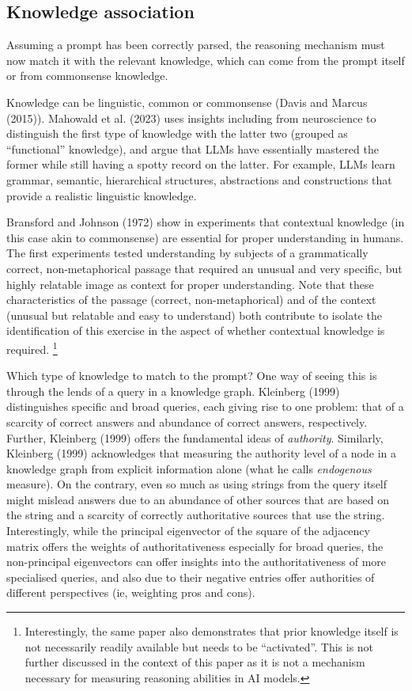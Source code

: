 \documentclass[
]{article}
\begin{document}
\subsection{Knowledge association}\label{knowledge-association}

Assuming a prompt has been correctly parsed, the reasoning mechanism
must now match it with the relevant knowledge, which can come from the
prompt itself or from commonsense knowledge.

Knowledge can be linguistic, common or commonsense (Davis and Marcus
(2015)). Mahowald et al. (2023) uses insights including from
neuroscience to distinguish the first type of knowledge with the latter
two (grouped as ``functional'' knowledge), and argue that LLMs have
essentially mastered the former while still having a spotty record on
the latter. For example, LLMs learn grammar, semantic, hierarchical
structures, abstractions and constructions that provide a realistic
linguistic knowledge.

Bransford and Johnson (1972) show in experiments that contextual
knowledge (in this case akin to commonsense) are essential for proper
understanding in humans. The first experiments tested understanding by
subjects of a grammatically correct, non-metaphorical passage that
required an unusual and very specific, but highly relatable image as
context for proper understanding. Note that these characteristics of the
passage (correct, non-metaphorical) and of the context (unusual but
relatable and easy to understand) both contribute to isolate the
identification of this exercise in the aspect of whether contextual
knowledge is required. \footnote{Interestingly, the same paper also
  demonstrates that prior knowledge itself is not necessarily readily
  available but needs to be ``activated''. This is not further discussed
  in the context of this paper as it is not a mechanism necessary for
  measuring reasoning abilities in AI models.}

Which type of knowledge to match to the prompt? One way of seeing this
is through the lends of a query in a knowledge graph. Kleinberg (1999)
distinguishes specific and broad queries, each giving rise to one
problem: that of a scarcity of correct answers and abundance of correct
answers, respectively. Further, Kleinberg (1999) offers the fundamental
ideas of \emph{authority}. Similarly, Kleinberg (1999) acknowledges that
measuring the authority level of a node in a knowledge graph from
explicit information alone (what he calls \emph{endogenous} measure). On
the contrary, even so much as using strings from the query itself might
mislead answers due to an abundance of other sources that are based on
the string and a scarcity of correctly authoritative sources that use
the string. Interestingly, while the principal eigenvector of the square
of the adjacency matrix offers the weights of authoritativeness
especially for broad queries, the non-principal eigenvectors can offer
insights into the authoritativeness of more specialised queries, and
also due to their negative entries offer authorities of different
perspectives (ie, weighting pros and cons).
\end{document}
